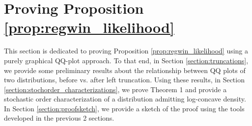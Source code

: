 


% 

\section{Proving Proposition \ref{prop:regwin_likelihood}}

\noindent This section is dedicated to proving Proposition \ref{prop:regwin_likelihood} using a purely graphical QQ-plot approach. To that end, in Section \ref{section:truncations}, we provide some preliminary results about the relationship between QQ plots of two distributions, before vs. after left truncation. Using these results, in Section \ref{section:stochorder_characterizations}, we prove Theorem 1 and provide a stochastic order characterization of a distribution admitting log-concave density. In Section \ref{section:proofsketch}, we provide a sketch of the proof using the tools developed in the previous 2 sections. 

